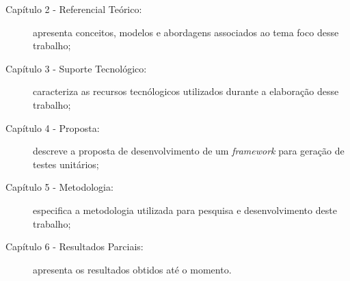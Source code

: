 \begin{description}
  \item[Capítulo 2 - Referencial Teórico:] apresenta conceitos, modelos e
    abordagens associados ao tema foco desse trabalho;

  \item[Capítulo 3 - Suporte Tecnológico:] caracteriza as recursos
    tecnólogicos utilizados durante a elaboração desse trabalho;

  \item[Capítulo 4 - Proposta:] descreve a proposta de desenvolvimento de
    um \textit{framework} para geração de testes unitários;

  \item[Capítulo 5 - Metodologia:] especifica a metodologia utilizada para
    pesquisa e desenvolvimento deste trabalho;

  \item[Capítulo 6 - Resultados Parciais:] apresenta os resultados obtidos
    até o momento.
\end{description}
